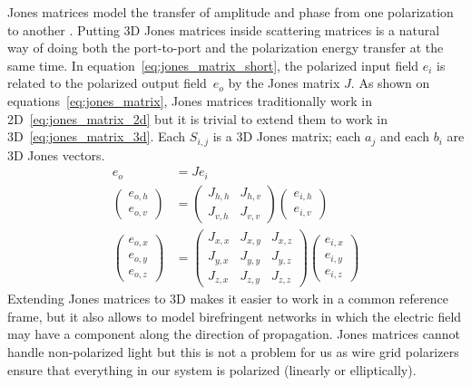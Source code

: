 \documentclass[a4paper,11pt]{article}
\begin{document}
Jones matrices model the transfer of amplitude and phase from one polarization to another \cite{hecht2002optics}.
Putting 3D Jones matrices inside scattering matrices is a natural way of doing both the port-to-port and the polarization energy transfer at the same time.
In equation~\eqref{eq:jones_matrix_short}, the polarized input field $e_i$ is related to the polarized output field~$e_o$ by the Jones matrix $J$.
As shown on equations~\eqref{eq:jones_matrix}, Jones matrices traditionally work in 2D~\eqref{eq:jones_matrix_2d} but it is trivial to extend them to work in 3D~\eqref{eq:jones_matrix_3d}.
Each $S_{i, j}$ is a 3D Jones matrix; each $a_j$ and each $b_i$ are 3D Jones vectors.
\begin{subequations}    
    \begin{align}
        e_o &= J e_i
        \label{eq:jones_matrix_short}
        \\
        \begin{pmatrix}
            e_{o, h}\\
            e_{o, v}
        \end{pmatrix}
        &=
        \begin{pmatrix}
            J_{h, h}   &   J_{h, v} \\
            J_{v, h}   &   J_{v, v}
        \end{pmatrix}
        \begin{pmatrix}
            e_{i, h}\\
            e_{i, v}
        \end{pmatrix}
        \label{eq:jones_matrix_2d}
        \\
        \begin{pmatrix}
            e_{o, x}\\
            e_{o, y}\\
            e_{o, z}
        \end{pmatrix}
        &=
        \begin{pmatrix}
            J_{x, x}   &   J_{x, y}   &   J_{x, z} \\
            J_{y, x}   &   J_{y, y}   &   J_{y, z} \\
            J_{z, x}   &   J_{z, y}   &   J_{z, z}
        \end{pmatrix}
        \begin{pmatrix}
            e_{i, x}\\
            e_{i, y}\\
            e_{i, z}
        \end{pmatrix}
        \label{eq:jones_matrix_3d}
    \end{align}
    \label{eq:jones_matrix}
\end{subequations}
Extending Jones matrices to 3D makes it easier to work in a common reference frame, but it also allows to model birefringent networks in which the electric field may have a component along the direction of propagation.
Jones matrices cannot handle non-polarized light but this is not a problem for us as wire grid polarizers ensure that everything in our system is polarized (linearly or elliptically).
\end{document}
